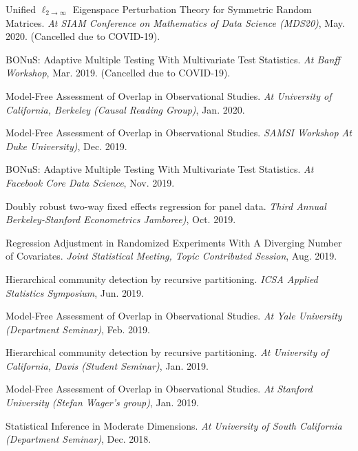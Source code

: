 \documentclass{article}
\begin{document}
\vspace{2mm}
Unified $\ell_{2\rightarrow\infty}$ Eigenspace Perturbation Theory for Symmetric Random Matrices. \emph{At SIAM Conference on Mathematics of Data Science (MDS20)}, May. 2020. (Cancelled due to COVID-19).

\vspace{2mm}
BONuS: Adaptive Multiple Testing With Multivariate Test Statistics. \emph{At Banff Workshop}, Mar. 2019. (Cancelled due to COVID-19).

\vspace{2mm}
Model-Free Assessment of Overlap in Observational Studies. \emph{At University of California, Berkeley (Causal Reading Group)}, Jan. 2020.

\vspace{2mm}
Model-Free Assessment of Overlap in Observational Studies. \emph{SAMSI Workshop At Duke University)}, Dec. 2019.

\vspace{2mm}
BONuS: Adaptive Multiple Testing With Multivariate Test Statistics. \emph{At Facebook Core Data Science}, Nov. 2019.

\vspace{2mm}
Doubly robust two-way fixed effects regression for panel data. \emph{Third Annual Berkeley-Stanford Econometrics Jamboree)}, Oct. 2019.

\vspace{2mm}
Regression Adjustment in Randomized Experiments With A Diverging Number of Covariates. \emph{Joint Statistical Meeting, Topic Contributed Session}, Aug. 2019.

\vspace{2mm}
Hierarchical community detection by recursive partitioning. \emph{ICSA Applied Statistics Symposium}, Jun. 2019.

\vspace{2mm}
Model-Free Assessment of Overlap in Observational Studies. \emph{At Yale University (Department Seminar)}, Feb. 2019.

\vspace{2mm}
Hierarchical community detection by recursive partitioning. \emph{At University of California, Davis (Student Seminar)}, Jan. 2019.

\vspace{2mm}
Model-Free Assessment of Overlap in Observational Studies. \emph{At Stanford University (Stefan Wager's group)}, Jan. 2019.

\vspace{2mm}
Statistical Inference in Moderate Dimensions. \emph{At University of South California (Department Seminar)}, Dec. 2018.
\end{document}
